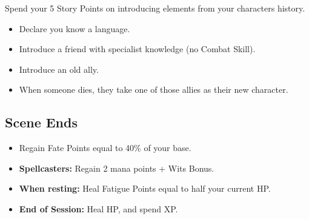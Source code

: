\begin{multicols}{2}
Spend your 5 Story Points on introducing elements from your characters history.

\begin{itemize}

  \item
  Declare you know a language.
  \item
  Introduce a friend with specialist knowledge (no Combat Skill).
  \item
  Introduce an old ally.
  \item
  When someone dies, they take one of those allies as their new character.

\end{itemize}

\subsection{Scene Ends}

\begin{itemize}

  \item
  Regain Fate Points equal to 40\% of your base.
  \item
  \textbf{Spellcasters:} Regain 2 mana points + Wits Bonus.
  \item
  \textbf{When resting:} Heal Fatigue Points equal to half your current HP.
  \item
  \textbf{End of Session:} Heal HP, and spend XP.

\end{itemize}

\end{multicols}
